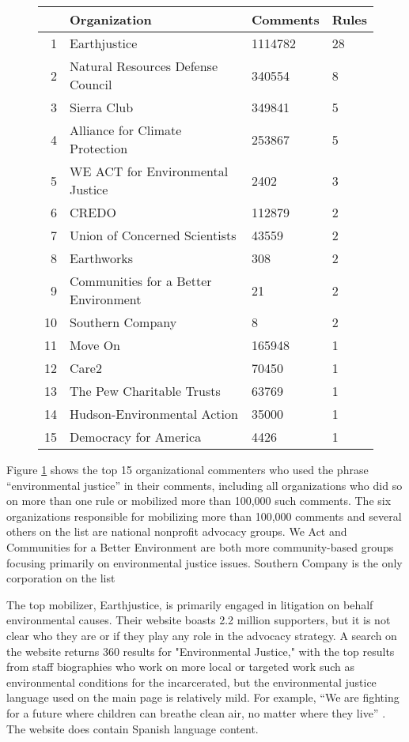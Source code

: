 \begin{figure}[!h]
\centering
\begin{tabular}{rlll}
  \hline
 & Organization & Comments & Rules \\ 
  \hline
1 & Earthjustice & 1114782 & 28 \\ 
  2 & Natural Resources Defense Council &  340554 &  8 \\ 
  3 & Sierra Club &  349841 &  5 \\ 
  4 & Alliance for Climate Protection &  253867 &  5 \\ 
  5 & WE ACT for Environmental Justice &    2402 &  3 \\ 
  6 & CREDO &  112879 &  2 \\ 
  7 & Union of Concerned Scientists &   43559 &  2 \\ 
  8 & Earthworks &     308 &  2 \\ 
  9 & Communities for a Better Environment &      21 &  2 \\ 
  10 & Southern Company &       8 &  2 \\ 
  11 & Move On &  165948 &  1 \\ 
  12 & Care2 &   70450 &  1 \\ 
  13 & The Pew Charitable Trusts &   63769 &  1 \\ 
  14 & Hudson-Environmental Action &   35000 &  1 \\ 
  15 & Democracy for America &    4426 &  1 \\ 
  \end{tabular}
  \label{fig:orgs}
  \end{figure}

Figure \ref{fig:orgs} shows the top 15 organizational commenters who used the phrase ``environmental justice'' in their comments, including all organizations who did so on more than one rule or mobilized more than 100,000 such comments. The six organizations responsible for mobilizing more than 100,000 comments and several others on the list are national nonprofit advocacy groups.  We Act and Communities for a Better Environment are both more community-based groups focusing primarily on environmental justice issues. Southern Company is the only corporation on the list
 
 The top mobilizer, Earthjustice, is primarily engaged in litigation on behalf environmental causes. Their website boasts 2.2 million supporters,  but it is not clear who they are or if they play any role in the advocacy strategy. A search on the website returns 360 results for "Environmental Justice," with the top results from staff biographies who work on more local or targeted work such as environmental conditions for the incarcerated, but the environmental justice language used on the main page is relatively mild. For example, ``We are fighting for a future where children can breathe clean air, no matter where they live'' \citep{Earthjustice2017OurWork}. The website does contain Spanish language content. 
 
